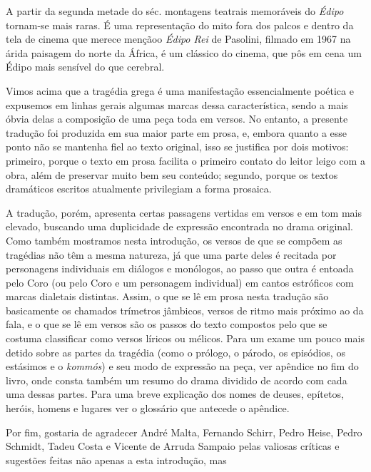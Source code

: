 A partir da segunda metade do séc.  montagens teatrais memoráveis do
\emph{Édipo} tornam-se mais raras. É uma representação do mito fora dos
palcos e dentro da tela de cinema que merece menção\quad o \emph{Édipo Rei}
de Pasolini, filmado em 1967 na árida paisagem do norte da
África, é um clássico do cinema, que pôs em cena um Édipo mais sensível
do que cerebral.

\asterisc{}

Vimos acima que a tragédia grega é uma manifestação essencialmente
poética e expusemos em linhas gerais algumas marcas dessa
característica, sendo a mais óbvia delas a composição de uma peça toda
em versos. No entanto, a presente tradução foi produzida em sua maior
parte em prosa, e, embora quanto a esse ponto não se mantenha fiel ao
texto original, isso se justifica por dois motivos: primeiro, porque o
texto em prosa facilita o primeiro contato do leitor leigo com a obra,
além de preservar muito bem seu conteúdo; segundo, porque os textos
dramáticos escritos atualmente privilegiam a forma prosaica.

A tradução, porém, apresenta certas passagens vertidas em versos e em
tom mais elevado, buscando uma duplicidade de expressão encontrada no
drama original. Como também mostramos nesta introdução, os versos de que
se compõem as tragédias não têm a mesma natureza, já que uma parte deles
é recitada por personagens individuais em diálogos e monólogos, ao passo
que outra é entoada pelo Coro (ou pelo Coro e um personagem individual)
em cantos estróficos com marcas dialetais distintas. Assim, o que se lê
em prosa nesta tradução são basicamente os chamados trímetros jâmbicos,
versos de ritmo mais próximo ao da fala, e o que se lê em versos são os
passos do texto compostos pelo que se costuma classificar como versos
líricos ou mélicos. Para um exame um pouco mais detido sobre as partes
da tragédia (como o prólogo, o párodo, os episódios, os estásimos e o
\emph{kommós}) e seu modo de expressão na peça, ver apêndice no fim do
livro, onde consta também um resumo do drama dividido de acordo com cada
uma dessas partes. Para uma breve explicação dos nomes de deuses,
epítetos, heróis, homens e lugares ver o glossário que antecede o
apêndice.

\asterisc

Por fim, gostaria de agradecer André Malta, Fernando Schirr, Pedro
Heise, Pedro Schmidt, Tadeu Costa e Vicente de Arruda Sampaio pelas
valiosas críticas e sugestões feitas não apenas a esta introdução, mas

